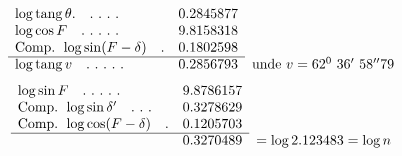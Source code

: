 \[
\begin{array}{lrl}
\log\operatorname{tang}\theta.\quad .\ .\ .\ .&0.2845877&\\
\log\cos F\quad .\ .\ .\ .\ .&9.8158318&\\
\text{Comp. }\log\sin(F-\delta)\quad .&0.1802598&\\\cline{1-2}
\log\operatorname{tang}v\quad .\ .\ .\ .\ .&0.2856793&\text{unde }v=62^0\ 36'\ 58''79
\end{array}
\]
\[
\begin{array}{lrl}
\log\sin F\quad .\ .\ .\ .\ .&9.8786157&\\
\text{Comp. }\log\sin\delta'\quad .\ .\ .&0.3278629&\\
\text{Comp. }\log\cos(F-\delta)\quad .&0.1205703&\\\cline{1-2}
&0.3270489&=\log 2.123483=\log n
\end{array}
\]
